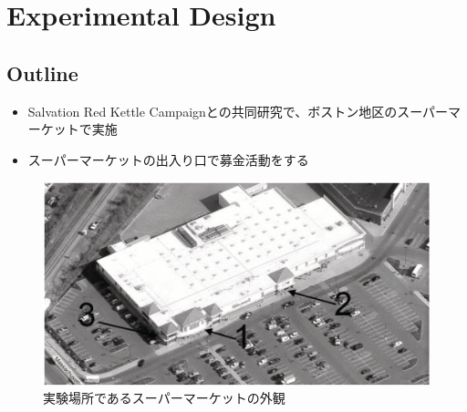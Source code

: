 \documentclass[../root]{subfiles}
\begin{document}
    \section{Experimental Design}

    \subsection{Outline}

    \begin{itemize}
        \item Salvation Red Kettle Campaignとの共同研究で、ボストン地区のスーパーマーケットで実施
        \item スーパーマーケットの出入り口で募金活動をする
    \end{itemize}

    \begin{figure}[h]
        \centering
        \includegraphics[width = 0.8\linewidth]{0821kato/fig1_1.png}
        \caption{実験場所であるスーパーマーケットの外観}
        \label{}
    \end{figure}
\end{document}
